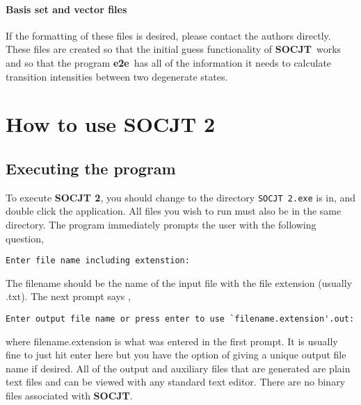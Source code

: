 \documentclass{article}
\newcommand{\socjttwo}{{\bf SOCJT 2}}
\newcommand{\socjt}{{\bf SOCJT}}
\newcommand{\etoe}{{\bf e2e}}
\begin{document}
\paragraph{Basis set and vector files}

If the formatting of these files is desired, please contact the
authors directly. These files are created so that the initial guess
functionality of \socjt\ works and so that the program \etoe\ has all
of the information it needs to calculate transition intensities
between two degenerate states.

\section{How to use SOCJT 2} \label{section:howto}

\subsection{Executing the program}
To execute \socjttwo , you should change to the directory {\tt SOCJT 2.exe} is in, and double click the application. All files you wish to run must also be in the same directory. The program immediately prompts the user
with the following question,
\begin{verbatim}
Enter file name including extenstion:
\end{verbatim}
The filename should be the name of the input file with the file extension (usually .txt). The next prompt says ,
\begin{verbatim}
Enter output file name or press enter to use `filename.extension'.out:
\end{verbatim}

where filename.extension is what was entered in the first prompt. It is usually fine to just hit enter here but you have the option of giving a unique output file name if desired. All of the output and
auxiliary files that are generated are plain text files and can be
viewed with any standard text editor. There are no binary files
associated with \socjt .
\end{document}
